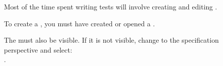 
Most of the time spent writing tests will involve creating and editing \gdcases{}. 

To create a \gdcase{}, you must have created or opened a \gdproject{} . 

The \gdtestcasebrowser{} must also be visible. If it is not visible, change to the specification perspective and select:\\
.

